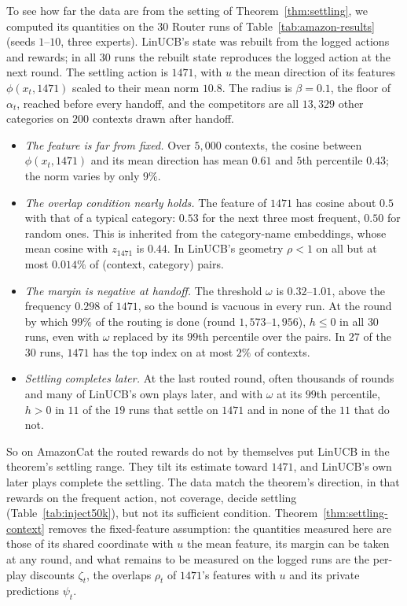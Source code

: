 \documentclass[anon]{alt2027} %
\begin{document}
To see how far the data are from the setting of Theorem~\ref{thm:settling},
we computed its quantities on the $30$ Router runs of
Table~\ref{tab:amazon-results} (seeds $1$--$10$, three experts). LinUCB's
state was rebuilt from the logged actions and rewards; in all $30$ runs the
rebuilt state reproduces the logged action at the next round. The settling
action is $1471$, with $u$ the mean direction of its features
$\phi(x_t,1471)$ scaled to their mean norm $10.8$. The radius is
$\beta=0.1$, the floor of $\alpha_t$, reached before every handoff, and the
competitors are all $13{,}329$ other categories on $200$ contexts drawn after
handoff.
\begin{itemize}[itemsep=1pt,topsep=2pt,leftmargin=*]
\item \emph{The feature is far from fixed.} Over $5{,}000$ contexts, the
cosine between $\phi(x_t,1471)$ and its mean direction has mean $0.61$ and
$5$th percentile $0.43$; the norm varies by only $9\%$.
\item \emph{The overlap condition nearly holds.} The feature of $1471$ has
cosine about $0.5$ with that of a typical category: $0.53$ for the next three most
frequent, $0.50$ for random ones. This is inherited from the category-name
embeddings, whose mean cosine with $z_{1471}$ is $0.44$. In LinUCB's
geometry $\rho<1$ on all but at most $0.014\%$ of (context, category) pairs.
\item \emph{The margin is negative at handoff.} The threshold $\omega$ is
$0.32$--$1.01$, above the frequency $0.298$ of $1471$, so the bound is vacuous in
every run. At the round by which $99\%$ of the routing is done (round
$1{,}573$--$1{,}956$), $h\le0$ in all $30$ runs, even with $\omega$ replaced
by its $99$th percentile over the pairs. In $27$ of the $30$ runs, $1471$ has the top index on at most $2\%$ of contexts.
\item \emph{Settling completes later.} At the last routed round, often thousands
of rounds and many of LinUCB's own plays later, and with $\omega$ at its
$99$th percentile, $h>0$ in $11$ of the $19$ runs that settle on $1471$ and in
none of the $11$ that do not.
\end{itemize}
So on AmazonCat the routed rewards do not by themselves put LinUCB in the
theorem's settling range. They tilt its estimate toward $1471$, and LinUCB's
own later plays complete the settling. The data match the theorem's
direction, in that rewards on the frequent action, not coverage, decide
settling (Table~\ref{tab:inject50k}), but not its sufficient condition. Theorem~\ref{thm:settling-context} removes the fixed-feature assumption:
the quantities measured here are those of its shared coordinate with $u$ the
mean feature, its margin can be taken at any round, and what remains to be
measured on the logged runs are the per-play discounts $\zeta_t$, the
overlaps $\rho_t$ of $1471$'s features with $u$ and its private predictions
$\psi_t$.
\end{document}
